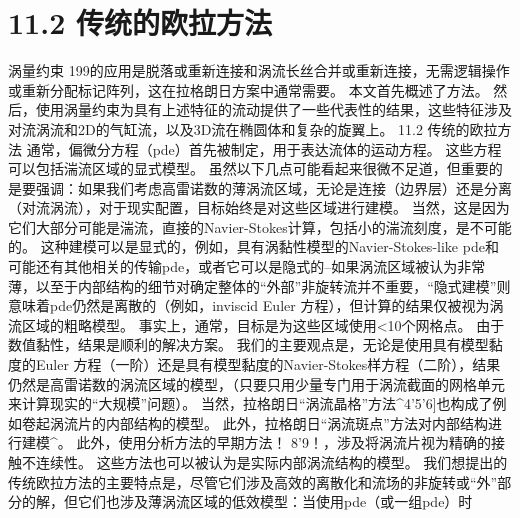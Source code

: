 \documentclass[UTF8,11pt,a4paper,openany,fontset=fandol]{ctexbook}
\begin{document}
\section{11.2 传统的欧拉方法}
涡量约束 199的应用是脱落或重新连接和涡流长丝合并或重新连接，无需逻辑操作或重新分配标记阵列，这在拉格朗日方案中通常需要。 本文首先概述了方法。 然后，使用涡量约束为具有上述特征的流动提供了一些代表性的结果，这些特征涉及对流涡流和2D的气缸流，以及3D流在椭圆体和复杂的旋翼上。 11.2 传统的欧拉方法 通常，偏微分方程（pde）首先被制定，用于表达流体的运动方程。 这些方程可以包括湍流区域的显式模型。 虽然以下几点可能看起来很微不足道，但重要的是要强调：如果我们考虑高雷诺数的薄涡流区域，无论是连接（边界层）还是分离（对流涡流），对于现实配置，目标始终是对这些区域进行建模。 当然，这是因为它们大部分可能是湍流，直接的Navier-Stokes计算，包括小的湍流刻度，是不可能的。 这种建模可以是显式的，例如，具有涡黏性模型的Navier-Stokes-like pde和可能还有其他相关的传输pde，或者它可以是隐式的--如果涡流区域被认为非常薄，以至于内部结构的细节对确定整体的“外部”非旋转流并不重要，“隐式建模”则意味着pde仍然是离散的（例如，inviscid Euler 方程），但计算的结果仅被视为涡流区域的粗略模型。 事实上，通常，目标是为这些区域使用<10个网格点。 由于数值黏性，结果是顺利的解决方案。 我们的主要观点是，无论是使用具有模型黏度的Euler 方程（一阶）还是具有模型黏度的Navier-Stokes样方程（二阶），结果仍然是高雷诺数的涡流区域的模型，（只要只用少量专门用于涡流截面的网格单元来计算现实的“大规模”问题）。 当然，拉格朗日“涡流晶格”方法\textasciicircum{}4'5'6]也构成了例如卷起涡流片的内部结构的模型。 此外，拉格朗日“涡流斑点”方法对内部结构进行建模\textasciicircum{}。 此外，使用分析方法的早期方法！ 8'9！，涉及将涡流片视为精确的接触不连续性。 这些方法也可以被认为是实际内部涡流结构的模型。 我们想提出的传统欧拉方法的主要特点是，尽管它们涉及高效的离散化和流场的非旋转或“外”部分的解，但它们也涉及薄涡流区域的低效模型：当使用pde（或一组pde）时
\end{document}
